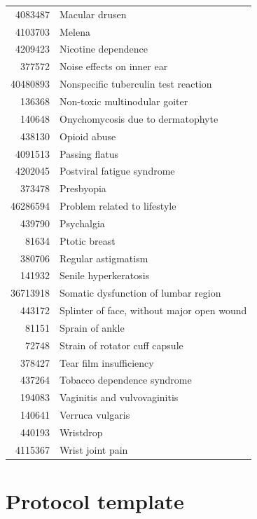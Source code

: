 \documentclass[10.5pt]{book}
\theoremstyle{definition}
\theoremstyle{definition}
\theoremstyle{definition}
\theoremstyle{remark}
\begin{document}
\begin{longtable}[]{@{}rl@{}}
4083487 & Macular drusen\tabularnewline
4103703 & Melena\tabularnewline
4209423 & Nicotine dependence\tabularnewline
377572 & Noise effects on inner ear\tabularnewline
40480893 & Nonspecific tuberculin test reaction\tabularnewline
136368 & Non-toxic multinodular goiter\tabularnewline
140648 & Onychomycosis due to dermatophyte\tabularnewline
438130 & Opioid abuse\tabularnewline
4091513 & Passing flatus\tabularnewline
4202045 & Postviral fatigue syndrome\tabularnewline
373478 & Presbyopia\tabularnewline
46286594 & Problem related to lifestyle\tabularnewline
439790 & Psychalgia\tabularnewline
81634 & Ptotic breast\tabularnewline
380706 & Regular astigmatism\tabularnewline
141932 & Senile hyperkeratosis\tabularnewline
36713918 & Somatic dysfunction of lumbar region\tabularnewline
443172 & Splinter of face, without major open wound\tabularnewline
81151 & Sprain of ankle\tabularnewline
72748 & Strain of rotator cuff capsule\tabularnewline
378427 & Tear film insufficiency\tabularnewline
437264 & Tobacco dependence syndrome\tabularnewline
194083 & Vaginitis and vulvovaginitis\tabularnewline
140641 & Verruca vulgaris\tabularnewline
440193 & Wristdrop\tabularnewline
4115367 & Wrist joint pain\tabularnewline
\bottomrule
\end{longtable}

\chapter{Protocol template}\label{ProtocolTemplate}
\end{document}
